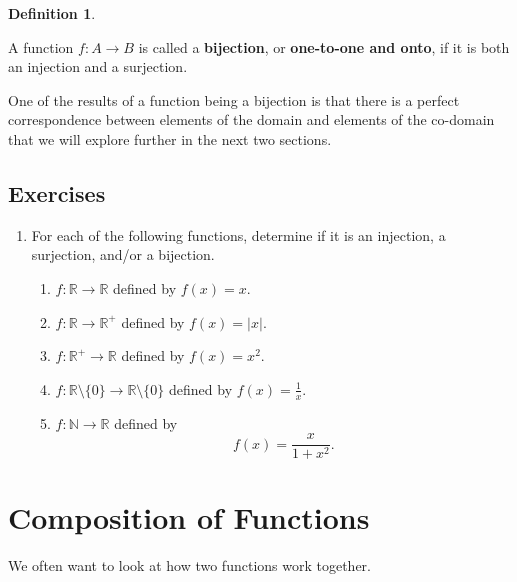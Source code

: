 \documentclass[
]{book}
\theoremstyle{definition}
\newtheorem{definition}{Definition}[chapter]
\theoremstyle{definition}
\theoremstyle{definition}
\theoremstyle{definition}
\theoremstyle{remark}
\begin{document}
\begin{definition}
\protect\hypertarget{def:unlabeled-div-64}{}\label{def:unlabeled-div-64}

A function \(f:A\rightarrow B\) is called a \textbf{bijection}, or \textbf{one-to-one and onto}, if it is both an injection and a surjection.

\end{definition}

One of the results of a function being a bijection is that there is a perfect correspondence between elements of the domain and elements of the co-domain that we will explore further in the next two sections.

\hypertarget{exercises-17}{%
\subsection{Exercises}\label{exercises-17}}

\begin{enumerate}
\def\labelenumi{\arabic{enumi}.}
\item
  For each of the following functions, determine if it is an injection, a surjection, and/or a bijection.

  \begin{enumerate}
  \def\labelenumii{\alph{enumii}.}
  \item
    \(f:\mathbb{R}\rightarrow \mathbb{R}\) defined by \(f(x)=x\).
  \item
    \(f:\mathbb{R} \rightarrow \mathbb{R}^+\) defined by \(f(x)=|x|\).
  \item
    \(f:\mathbb{R}^+ \rightarrow \mathbb{R}\) defined by \(f(x)=x^2\).
  \item
    \(f:\mathbb{R}\setminus \{0\} \rightarrow \mathbb{R}\setminus \{0\}\) defined by \(f(x)=\frac{1}{x}\).
  \item
    \(f:\mathbb{N} \rightarrow \mathbb{R}\) defined by \[f(x)=\frac{x}{1+x^2}.\]
  \end{enumerate}
\end{enumerate}

\hypertarget{sec:Compositions}{%
\section{Composition of Functions}\label{sec:Compositions}}

We often want to look at how two functions work together.
\end{document}

